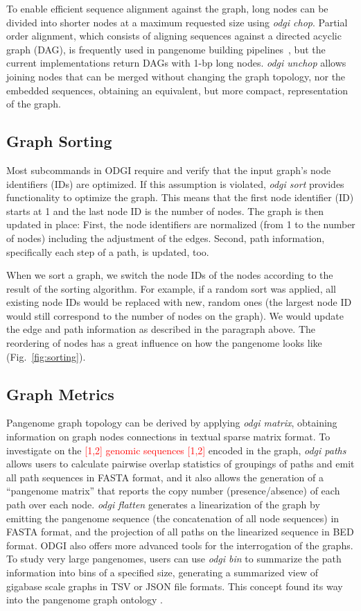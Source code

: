\documentclass{bioinfo}
\newcommand{\REVIEWED}[1]{{\textcolor{Red}{#1}}}
\begin{document}
To enable efficient sequence alignment against the graph, long nodes can be divided into shorter nodes at a maximum requested size using \textit{odgi chop}.
Partial order alignment, which consists of aligning sequences against a directed acyclic graph (DAG), is frequently used in pangenome building pipelines~\citep{pggb}, but the current implementations return DAGs with 1-bp long nodes.
\textit{odgi unchop} allows joining nodes that can be merged without changing the graph topology, nor the embedded sequences, obtaining an equivalent, but more compact, representation of the graph.

\subsection{Graph Sorting}
\label{sec:supp_sorting}
Most subcommands in ODGI require and verify that the input graph’s node identifiers (IDs) are optimized. If this assumption is violated, \textit{odgi sort} provides functionality to optimize the graph. This means that the first node identifier (ID) starts at 1 and the last node ID is the number of nodes. The graph is then updated in place: First, the node identifiers are normalized (from 1 to the number of nodes) including the adjustment of the edges. Second, path information, specifically each step of a path, is updated, too.

When we sort a graph, we switch the node IDs of the nodes according to the result of the sorting algorithm. For example, if a random sort was applied, all existing node IDs would be replaced with new, random ones (the largest node ID would still correspond to the number of nodes on the graph). We would update the edge and path information as described in the paragraph above. The reordering of nodes has a great influence on how the pangenome looks like (Fig.~\ref{fig:sorting}).


\subsection{Graph Metrics}
\label{sec:supp_metrics}
Pangenome graph topology can be derived by applying \textit{odgi matrix}, obtaining information on graph nodes connections in textual sparse matrix format.
To investigate on the \REVIEWED{[1,2] genomic sequences [1,2]} encoded in the graph, \textit{odgi paths} allows users to calculate pairwise overlap statistics of groupings of paths and emit all path sequences in FASTA format, and it also allows the generation of a ``pangenome matrix'' that reports the copy number (presence/absence) of each path over each node.
\textit{odgi flatten} generates a linearization of the graph by emitting the pangenome sequence (the concatenation of all node sequences) in FASTA format, and the projection of all paths on the linearized sequence in BED format.
ODGI also offers more advanced tools for the interrogation of the graphs.
To study very large pangenomes, users can use \textit{odgi bin} to summarize the path information into bins of a specified size, generating a summarized view of gigabase scale graphs in TSV or JSON file formats.
This concept found its way into the pangenome graph ontology \citep{Yokoyama2020}. %
\end{document}
